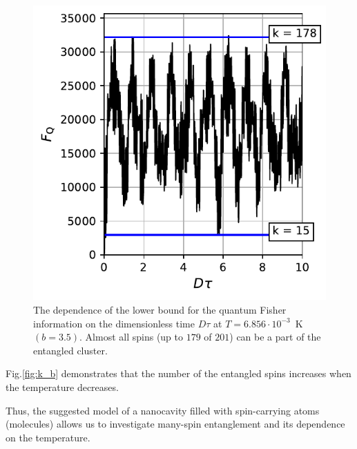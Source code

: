 \documentclass[
    pra,  
    twocolumn, 
    floatfix, 
    amsmath, 
    amssymb, 
    superscriptaddress
]{revtex4-1}
\begin{document}
\begin{figure}
    \centering
    \includegraphics{m2_t_b3_5.pdf}
    \caption{The dependence of the lower bound for the quantum Fisher information on the dimensionless time $D\tau$ at ${T=6.856\cdot10^{-3}}$~K $(b=3.5)$.
    Almost all spins (up to $179$ of $201$) can be a part of the entangled cluster.}
    \label{fig:m2_t_b3.5}
\end{figure}
\par 
Fig.\ref{fig:k_b} demonstrates that the number of the entangled spins increases when the temperature decreases.
\par
Thus, the suggested model of a nanocavity filled with spin-carrying atoms (molecules) allows us to investigate many-spin entanglement and its dependence on the temperature.
\end{document}
